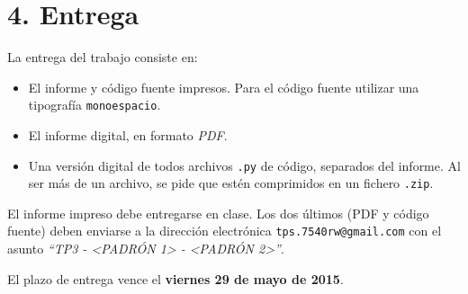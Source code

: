 \documentclass[12pt,spanish,]{article}
\begin{document}
\section{4. Entrega}\label{entrega}

La entrega del trabajo consiste en:

\begin{itemize}
\item
  El informe y código fuente impresos. Para el código fuente utilizar
  una tipografía \texttt{monoespacio}.
\item
  El informe digital, en formato \emph{PDF}.
\item
  Una versión digital de todos archivos \texttt{.py} de código,
  separados del informe. Al ser más de un archivo, se pide que estén
  comprimidos en un fichero \texttt{.zip}.
\end{itemize}

El informe impreso debe entregarse en clase. Los dos últimos (PDF y
código fuente) deben enviarse a la dirección electrónica
\texttt{tps.7540rw@gmail.com} con el asunto \emph{``TP3 -
\textless{}PADRÓN 1\textgreater{} - \textless{}PADRÓN
2\textgreater{}''}.

El plazo de entrega vence el \textbf{viernes 29 de mayo de 2015}.
\end{document}
